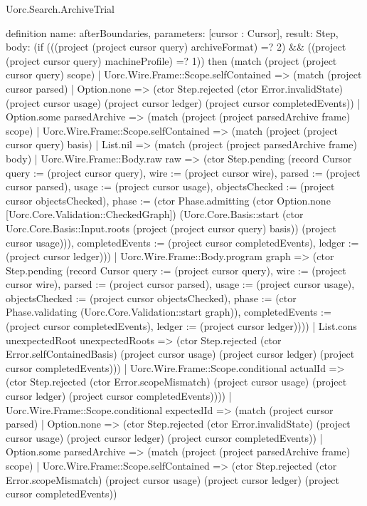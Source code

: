 \begin{lexlean}{Uorc.Search.ArchiveTrial}
\begin{semanticmodule}
definition{
  name: afterBoundaries,
  parameters: [cursor : Cursor],
  result: Step,
  body: (if (((project (project cursor query) archiveFormat) =? 2) && ((project (project cursor query) machineProfile) =? 1)) then (match (project (project cursor query) scope)
    | Uorc.Wire.Frame::Scope.selfContained => (match (project cursor parsed)
      | Option.none => (ctor Step.rejected (ctor Error.invalidState) (project cursor usage) (project cursor ledger) (project cursor completedEvents))
      | Option.some parsedArchive => (match (project (project parsedArchive frame) scope)
        | Uorc.Wire.Frame::Scope.selfContained => (match (project (project cursor query) basis)
          | List.nil => (match (project (project parsedArchive frame) body)
            | Uorc.Wire.Frame::Body.raw raw => (ctor Step.pending (record Cursor {query := (project cursor query), wire := (project cursor wire), parsed := (project cursor parsed), usage := (project cursor usage), objectsChecked := (project cursor objectsChecked), phase := (ctor Phase.admitting (ctor Option.none [Uorc.Core.Validation::CheckedGraph]) (Uorc.Core.Basis::start (ctor Uorc.Core.Basis::Input.roots (project (project cursor query) basis)) (project cursor usage))), completedEvents := (project cursor completedEvents), ledger := (project cursor ledger)}))
            | Uorc.Wire.Frame::Body.program graph => (ctor Step.pending (record Cursor {query := (project cursor query), wire := (project cursor wire), parsed := (project cursor parsed), usage := (project cursor usage), objectsChecked := (project cursor objectsChecked), phase := (ctor Phase.validating (Uorc.Core.Validation::start graph)), completedEvents := (project cursor completedEvents), ledger := (project cursor ledger)})))
          | List.cons unexpectedRoot unexpectedRoots => (ctor Step.rejected (ctor Error.selfContainedBasis) (project cursor usage) (project cursor ledger) (project cursor completedEvents)))
        | Uorc.Wire.Frame::Scope.conditional actualId => (ctor Step.rejected (ctor Error.scopeMismatch) (project cursor usage) (project cursor ledger) (project cursor completedEvents))))
    | Uorc.Wire.Frame::Scope.conditional expectedId => (match (project cursor parsed)
      | Option.none => (ctor Step.rejected (ctor Error.invalidState) (project cursor usage) (project cursor ledger) (project cursor completedEvents))
      | Option.some parsedArchive => (match (project (project parsedArchive frame) scope)
        | Uorc.Wire.Frame::Scope.selfContained => (ctor Step.rejected (ctor Error.scopeMismatch) (project cursor usage) (project cursor ledger) (project cursor completedEvents))
}
\end{semanticmodule}
\end{lexlean}
